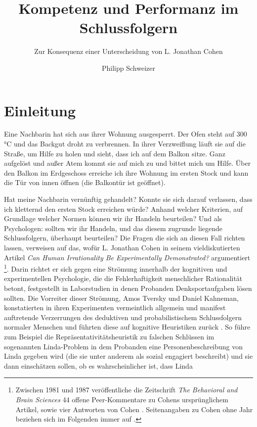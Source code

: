 \documentclass[ngerman,12pt, titlepage, smallheadings, nomath]{scrartcl}
\title{Kompetenz und Performanz im Schlussfolgern}
\subtitle{Zur Konsequenz einer Unterscheidung von L. Jonathan Cohen}
\author{Philipp Schweizer}
\date{}
\begin{document}
\maketitle

{
\setcounter{tocdepth}{3}
\tableofcontents
}
\newpage

\section{Einleitung}\label{einleitung}

\vspace{-1.25em}

Eine Nachbarin hat sich aus ihrer Wohnung ausgesperrt. Der Ofen steht
auf 300 °C und das Backgut droht zu verbrennen. In ihrer Verzweiflung
läuft sie auf die Straße, um Hilfe zu holen und sieht, dass ich auf dem
Balkon sitze. Ganz aufgelöst und außer Atem kommt sie auf mich zu und
bittet mich um Hilfe. Über den Balkon im Erdgeschoss erreiche ich ihre
Wohnung im ersten Stock und kann die Tür von innen öffnen (die Balkontür
ist geöffnet).

Hat meine Nachbarin vernünftig gehandelt? Konnte sie sich darauf
verlassen, dass ich kletternd den ersten Stock erreichen würde? Anhand
welcher Kriterien, auf Grundlage welcher Normen können wir ihr Handeln
beurteilen? Und als Psychologen: sollten wir ihr Handeln, und das diesem
zugrunde liegende Schlussfolgern, überhaupt beurteilen? Die Fragen die
sich an diesen Fall richten lassen, verweisen auf das, wofür L. Jonathan
Cohen in seinem vieldiskutierten Artikel \emph{Can Human Irrationality
Be Experimentally Demonstrated?} argumentiert
\autocite*{cohen1981a}\footnote{Zwischen 1981 und 1987 veröffentliche
  die Zeitschrift \emph{The Behavioral and Brain Sciences} 44 offene
  Peer-Kommentare zu Cohens ursprünglichem Artikel, sowie vier Antworten
  von Cohen \autocites{cohen1981b}{cohen1983}{cohen1984}{cohen1987}.
  Seitenangaben zu Cohen ohne Jahr beziehen sich im Folgenden immer auf
  \autocite*{cohen1981a}.}. Darin richtet er sich gegen eine Strömung
innerhalb der kognitiven und experimentellen Psychologie, die die
Fehlerhaftigkeit menschlicher Rationalität betont, festgestellt in
Laborstudien in denen Probanden Denksportaufgaben lösen sollten. Die
Vorreiter dieser Strömung, Amos Tversky und Daniel Kahneman,
konstatierten in ihren Experimenten vermeintlich allgemein und manifest
auftretende Verzerrungen des deduktiven und probabilistischem
Schlussfolgern normaler Menschen und führten diese auf kognitive
Heuristiken zurück \autocite*{tversky1974}. So führe zum Beispiel die
Repräsentativitätsheuristik zu falschen Schlüssen im sogenannten
Linda-Problem in dem Probanden eine Personenbeschreibung von Linda
gegeben wird (die sie unter anderem als sozial engagiert beschreibt) und
sie dann einschätzen sollen, ob es wahrscheinlicher ist, dass Linda
\end{document}
